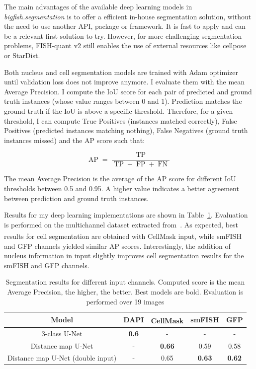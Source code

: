 The main advantages of the available deep learning models in \emph{bigfish.segmentation} is to offer a efficient in-house segmentation solution, without the need to use another API, package or framework.
It is fast to apply and can be a relevant first solution to try.
However, for more challenging segmentation problems, FISH-quant v2 still enables the use of external resources like cellpose or StarDist.

Both nucleus and cell segmentation models are trained with Adam optimizer~\cite{Diederik_2015} until validation loss does not improve anymore.
I evaluate them with the mean Average Precision.
I compute the \ac{IoU} score for each pair of predicted and ground truth instances (whose value ranges between 0 and 1).
Prediction matches the ground truth if the \ac{IoU} is above a specific threshold.
Therefore, for a given threshold, I can compute True Positives (instances matched correctly), False Positives (predicted instances matching nothing), False Negatives (ground truth instances missed) and the \ac{AP} score such that:

\begin{equation}
	{\displaystyle \operatorname{AP} = \frac{\operatorname{TP}}{\operatorname{TP} + \operatorname{FP} + \operatorname{FN}}}
\end{equation}

\noindent
The mean Average Precision is the average of the \ac{AP} score for different \ac{IoU} thresholds between 0.5 and 0.95.
A higher value indicates a better agreement between prediction and ground truth instances.

Results for my deep learning implementations are shown in Table~\ref{table:segmentation_results}.
Evaluation is performed on the multichannel dataset extracted from~\cite{safieddine_choreography_2021}.
As expected, best results for cell segmentation are obtained with CellMask\textsuperscript{\texttrademark} input, while \ac{smFISH} and \ac{GFP} channels yielded similar \ac{AP} scores.
Interestingly, the addition of nucleus information in input slightly improves cell segmentation results for the \ac{smFISH} and \ac{GFP} channels.

\begin{table}[]
	\centering
	\begin{tabular}{| c | c | c | c | c |}
		\hline
		Model & DAPI & CellMask\textsuperscript{\texttrademark} & smFISH & GFP\\
		\hline
		3-class U-Net & \textbf{0.6} & - & - & -\\
		Distance map U-Net & - & \textbf{0.66} & 0.59 & 0.58\\
		Distance map U-Net (double input) & - & 0.65 & \textbf{0.63} & \textbf{0.62}\\
		\hline
	\end{tabular}
	\caption[Segmentation results]{Segmentation results for different input channels.
	Computed score is the mean Average Precision, the higher, the better.
	Best models are bold.
	Evaluation is performed over 19 images}
	\label{table:segmentation_results}
\end{table}

